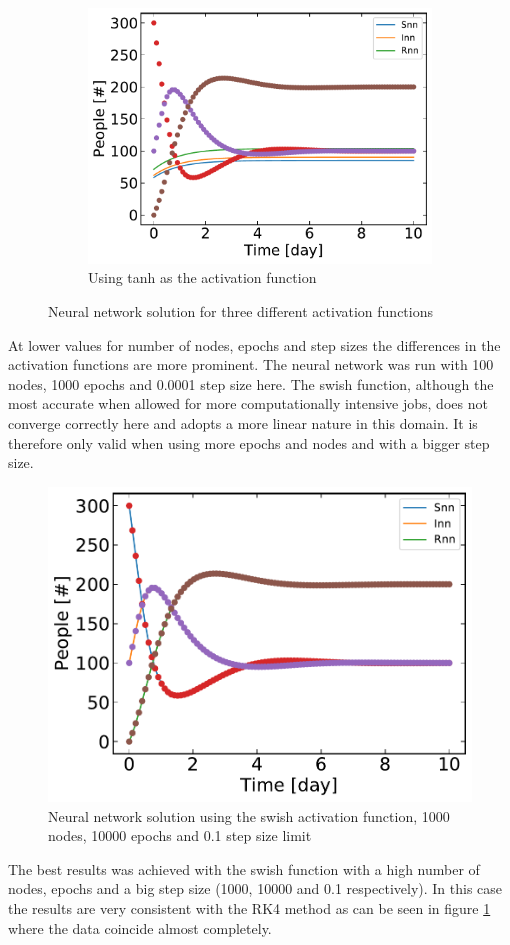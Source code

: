 \begin{figure}[H]
\begin{subfigure}{0.5\textwidth}
		\includegraphics[width=\linewidth]{result/Resultater_supervised/tanh_100_1000_0001.pdf}
		\caption{Using tanh as the activation function}
	\end{subfigure}
	\caption{Neural network solution for three different activation functions}
	\end{figure}
	At lower values for number of nodes, epochs and step sizes the differences in the activation functions are more prominent. The neural network was run with 100 nodes, 1000 epochs and 0.0001 step size here. The swish function, although the most accurate when allowed for more computationally intensive jobs, does not converge correctly here and adopts a more linear nature in this domain. It is therefore only valid when using more epochs and nodes and with a bigger step size.
	
	\begin{figure}[H]
		\centering
		\includegraphics[width=0.5\linewidth]{result/Resultater_supervised/swish_1000_10000_01}
		\caption{Neural network solution using the swish activation function, 1000 nodes, 10000 epochs and 0.1 step size limit}
		\label{fig:swish}
	\end{figure}
	The best results was achieved with the swish function with a high number of nodes, epochs and a big step size (1000, 10000 and 0.1 respectively). In this case the results are very consistent with the RK4 method as can be seen in figure \ref{fig:swish} where the data coincide almost completely. 
	

